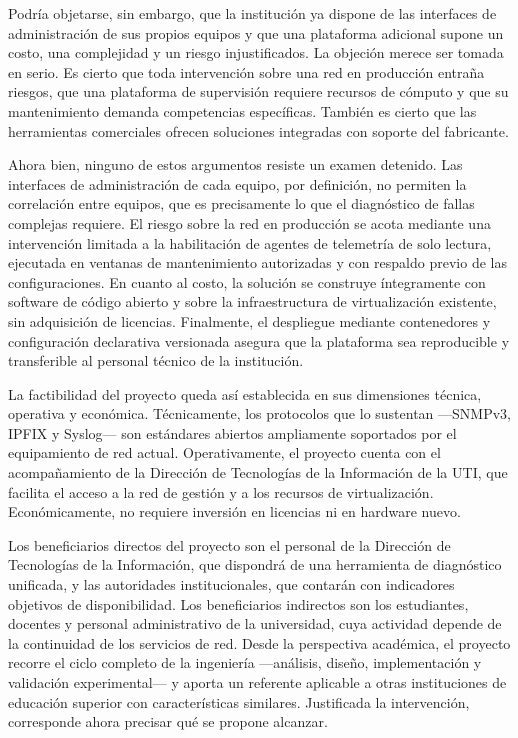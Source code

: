 Podría objetarse, sin embargo, que la institución ya dispone de las interfaces de administración de sus propios equipos y que una plataforma adicional supone un costo, una complejidad y un riesgo injustificados. La objeción merece ser tomada en serio. Es cierto que toda intervención sobre una red en producción entraña riesgos, que una plataforma de supervisión requiere recursos de cómputo y que su mantenimiento demanda competencias específicas. También es cierto que las herramientas comerciales ofrecen soluciones integradas con soporte del fabricante.

Ahora bien, ninguno de estos argumentos resiste un examen detenido. Las interfaces de administración de cada equipo, por definición, no permiten la correlación entre equipos, que es precisamente lo que el diagnóstico de fallas complejas requiere. El riesgo sobre la red en producción se acota mediante una intervención limitada a la habilitación de agentes de telemetría de solo lectura, ejecutada en ventanas de mantenimiento autorizadas y con respaldo previo de las configuraciones. En cuanto al costo, la solución se construye íntegramente con software de código abierto y sobre la infraestructura de virtualización existente, sin adquisición de licencias. Finalmente, el despliegue mediante contenedores y configuración declarativa versionada asegura que la plataforma sea reproducible y transferible al personal técnico de la institución.

La factibilidad del proyecto queda así establecida en sus dimensiones técnica, operativa y económica. Técnicamente, los protocolos que lo sustentan ---SNMPv3, IPFIX y Syslog--- son estándares abiertos ampliamente soportados por el equipamiento de red actual. Operativamente, el proyecto cuenta con el acompañamiento de la Dirección de Tecnologías de la Información de la UTI, que facilita el acceso a la red de gestión y a los recursos de virtualización. Económicamente, no requiere inversión en licencias ni en hardware nuevo.

Los beneficiarios directos del proyecto son el personal de la Dirección de Tecnologías de la Información, que dispondrá de una herramienta de diagnóstico unificada, y las autoridades institucionales, que contarán con indicadores objetivos de disponibilidad. Los beneficiarios indirectos son los estudiantes, docentes y personal administrativo de la universidad, cuya actividad depende de la continuidad de los servicios de red. Desde la perspectiva académica, el proyecto recorre el ciclo completo de la ingeniería ---análisis, diseño, implementación y validación experimental--- y aporta un referente aplicable a otras instituciones de educación superior con características similares. Justificada la intervención, corresponde ahora precisar qué se propone alcanzar.

